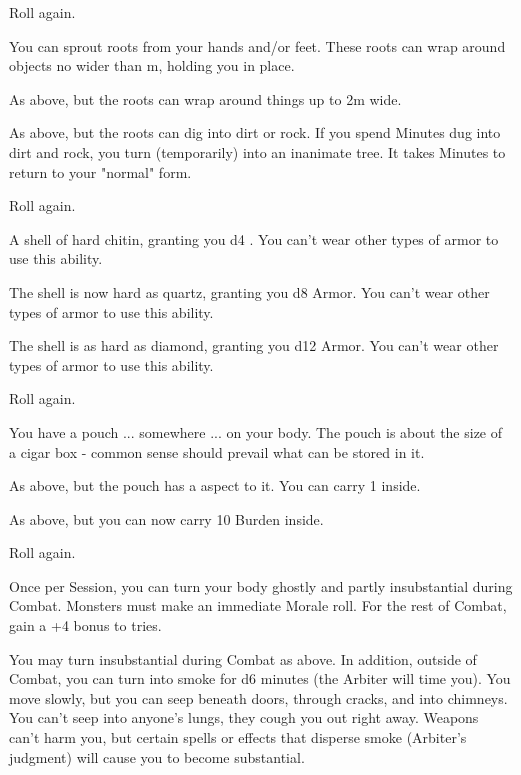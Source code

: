 \begin{multicols*}{2}
 Roll again.

\NC[Name=Rooty]

 You can sprout roots from your hands and/or feet.  These roots can wrap around objects no wider than \OneHalf m, holding you in place.

 As above, but the roots can wrap around things up to 2m wide.

 As above, but the roots can dig into dirt or rock. If you spend Minutes dug into dirt and rock, you turn (temporarily) into an inanimate tree. It takes Minutes to return to your "normal" form. 

 Roll again.

\cbreak

\NC[Name=Shell]

  A shell of hard chitin, granting you d4 . You can't wear other types of armor to use this ability.

  The shell is now hard as quartz, granting you d8 Armor. You can't wear other types of armor to use this ability.

  The shell is as hard as diamond, granting you d12 Armor. You can't wear other types of armor to use this ability.

  Roll again.

\NC[Name=Skin Bag]

  You have a pouch ... somewhere ... on your body.  The pouch is about the size of a cigar box - common sense should prevail what can be stored in it.

  As above, but the pouch has a  aspect to it.  You can carry 1  inside.

  As above, but you can now carry 10 Burden inside.

  Roll again.

\NC[Name=Smoky]

 Once per Session, you can turn your body ghostly and partly insubstantial during Combat.  Monsters must make an immediate Morale roll. For the rest of Combat, gain a +4 bonus to  tries.

 You may turn insubstantial during Combat as above.  In addition, outside of Combat, you can turn into smoke for d6 minutes (the Arbiter will time you).  You move slowly, but you can seep beneath doors, through cracks, and into chimneys. You can't seep into anyone's lungs, they cough you out right away. Weapons can't harm you, but certain spells or effects that disperse smoke (Arbiter's judgment) will cause you to become substantial.


\end{multicols*}

